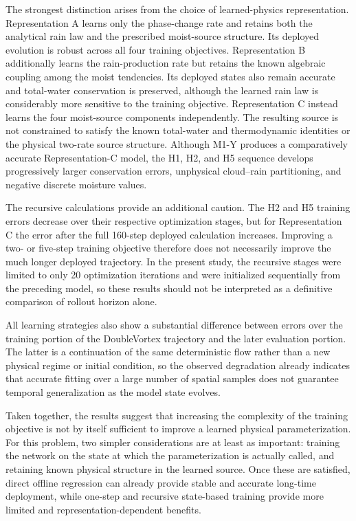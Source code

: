 \documentclass[12pt]{article}
\begin{document}
	The strongest distinction arises from the choice of learned-physics
	representation. Representation A learns only the phase-change rate and retains
	both the analytical rain law and the prescribed moist-source structure.
	Its deployed evolution is robust across all four training objectives.
	Representation B additionally learns the rain-production rate but retains the
	known algebraic coupling among the moist tendencies. Its deployed states also
	remain accurate and total-water conservation is preserved, although the
	learned rain law is considerably more sensitive to the training objective.
	Representation C instead learns the four moist-source components independently.
	The resulting source is not constrained to satisfy the known total-water and
	thermodynamic identities or the physical two-rate source structure. Although
	M1-Y produces a comparatively accurate Representation-C model, the H1, H2,
	and H5 sequence develops progressively larger conservation errors, unphysical
	cloud--rain partitioning, and negative discrete moisture values.
	
	The recursive calculations provide an additional caution. The H2 and H5
	training errors decrease over their respective optimization stages, but for
	Representation C the error after the full 160-step deployed calculation
	increases. Improving a two- or five-step training objective therefore does not
	necessarily improve the much longer deployed trajectory. In the present
	study, the recursive stages were limited to only 20 optimization iterations
	and were initialized sequentially from the preceding model, so these results
	should not be interpreted as a definitive comparison of rollout horizon alone.
	
	All learning strategies also show a substantial difference between errors over
	the training portion of the DoubleVortex trajectory and the later evaluation
	portion. The latter is a continuation of the same deterministic flow rather
	than a new physical regime or initial condition, so the observed degradation
	already indicates that accurate fitting over a large number of spatial samples
	does not guarantee temporal generalization as the model state evolves.
	
	Taken together, the results suggest that increasing the complexity of the
	training objective is not by itself sufficient to improve a learned physical
	parameterization. For this problem, two simpler considerations are at least as
	important: training the network on the state at which the parameterization is
	actually called, and retaining known physical structure in the learned source.
	Once these are satisfied, direct offline regression can already provide stable
	and accurate long-time deployment, while one-step and recursive state-based
	training provide more limited and representation-dependent benefits.
	
\end{document}
